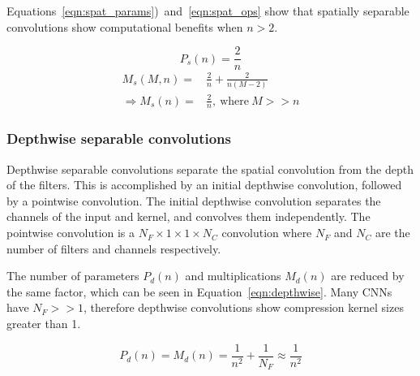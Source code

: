 \documentclass{article}
\begin{document}
	Equations~\ref{eqn:spat_params})~and~\ref{eqn:spat_ops} show that spatially separable convolutions show computational benefits when $n > 2$. 
	
	\vspace{-1cm}
	
	\begin{multicols}{2}
		\begin{equation}\label{eqn:spat_params}
			P_s(n) = \frac{2}{n}
		\end{equation}
	\break
		\begin{equation}\label{eqn:spat_ops}
			\begin{split}
				M_s(M, n) = & \frac{2}{n} + \frac{2}{n(M-2)} \\
				\Rightarrow M_s(n) = & \frac{2}{n},~\text{where}~M >> n
			\end{split}
		\end{equation}		
	\end{multicols}
	
	\subsubsection{Depthwise separable convolutions}	
	
	Depthwise separable convolutions separate the spatial convolution from the depth of the filters. This is accomplished by an initial depthwise convolution, followed by a pointwise convolution. The initial depthwise convolution separates the channels of the input and kernel, and convolves them independently. The pointwise convolution is a $N_F \times 1 \times 1 \times N_C$ convolution where $N_F$ and $N_C$ are the number of filters and channels respectively. 
	
	The number of parameters $P_d(n)$ and multiplications $M_d(n)$ are reduced by the same factor, which can be seen in Equation~\ref{eqn:depthwise}. Many CNNs have $N_F >> 1$, therefore depthwise convolutions show compression kernel sizes greater than 1. 

	\begin{equation} \label{eqn:depthwise}
		P_d(n) = M_d(n) = \frac{1}{n^2} + \frac{1}{N_F} \approx \frac{1}{n^2}
	\end{equation}
	
	
\end{document}
